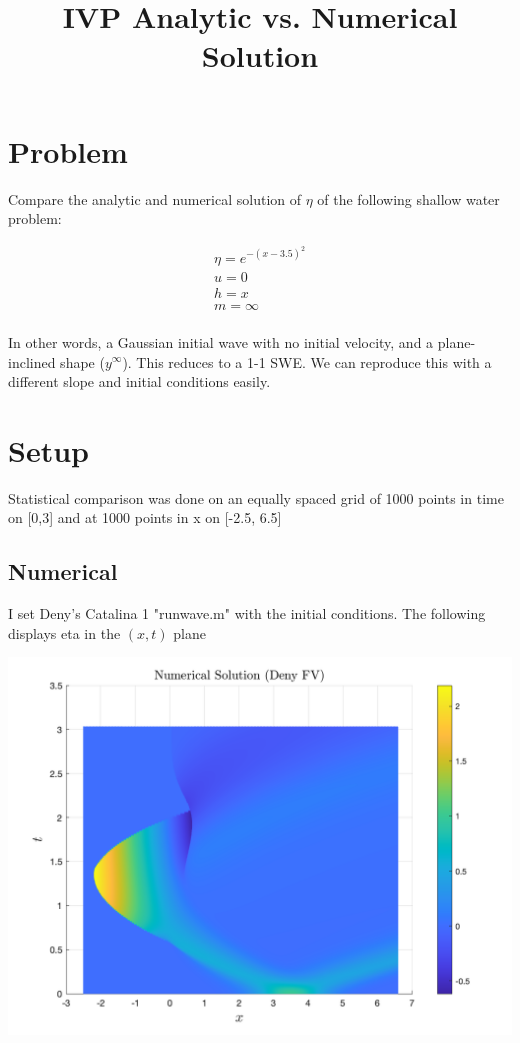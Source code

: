 \documentclass{article}
\title{IVP Analytic vs. Numerical Solution}
\begin{document}
\maketitle

\section{Problem}

Compare the analytic and numerical solution of $\eta$ of the following shallow water problem:

\[
\begin{aligned}
\eta = e^{-(x-3.5)^2} \\
u = 0 \\
h = x \\
m = \infty  \\
\end{aligned}
\]

In other words, a Gaussian initial wave with no initial velocity, and a plane-inclined shape ($y^\infty$). This reduces to a 1-1 SWE. We can reproduce this with a different slope and initial conditions easily.

\section{Setup}

Statistical comparison was done on an equally spaced grid of 1000 points in time on [0,3] and at 1000 points in x on [-2.5, 6.5]


\subsection{Numerical}

I set Deny's Catalina 1 "runwave.m" with the initial conditions. The following displays eta in the $(x,t)$ plane

\includegraphics[width=\linewidth]{num.png} 
\end{document}
